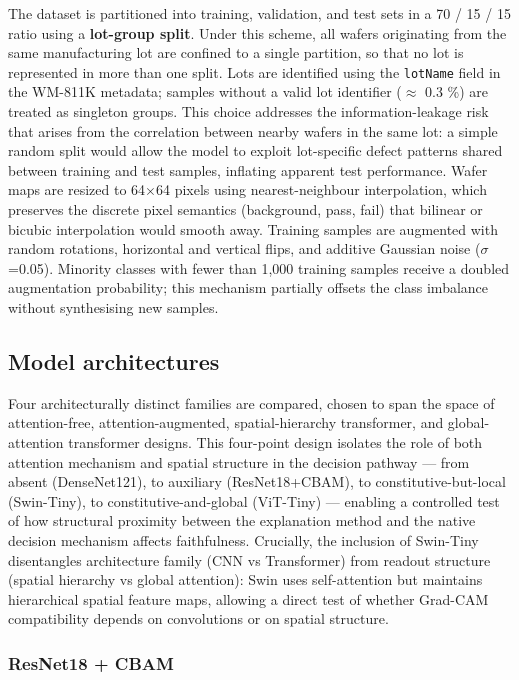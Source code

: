 \documentclass[11pt,a4paper]{article}
\begin{document}
The dataset is partitioned into training, validation, and test sets in a 70 / 15 / 15 ratio using a \textbf{lot-group split}. Under this scheme, all wafers originating from the same manufacturing lot are confined to a single partition, so that no lot is represented in more than one split. Lots are identified using the \texttt{lotName} field in the WM-811K metadata; samples without a valid lot identifier ($\approx$ 0.3 \%) are treated as singleton groups. This choice addresses the information-leakage risk that arises from the correlation between nearby wafers in the same lot: a simple random split would allow the model to exploit lot-specific defect patterns shared between training and test samples, inflating apparent test performance. Wafer maps are resized to 64$\times$64 pixels using nearest-neighbour interpolation, which preserves the discrete pixel semantics (background, pass, fail)
that bilinear or bicubic interpolation would smooth away. Training samples are augmented with random rotations, horizontal and vertical flips, and additive Gaussian noise ($\sigma$=0.05). Minority classes with fewer than 1,000 training samples receive a doubled augmentation probability; this mechanism partially offsets the class imbalance without synthesising new samples.

\subsection{Model architectures}

Four architecturally distinct families are compared, chosen to span the space of attention-free, attention-augmented, spatial-hierarchy transformer, and global-attention transformer designs. This four-point design isolates the role of both attention mechanism and spatial structure in the decision pathway --- from absent (DenseNet121), to auxiliary (ResNet18+CBAM), to constitutive-but-local (Swin-Tiny), to constitutive-and-global (ViT-Tiny) --- enabling a controlled test of how structural proximity between the explanation method and the native decision mechanism affects faithfulness. Crucially, the inclusion of Swin-Tiny disentangles architecture family (CNN vs Transformer) from readout structure (spatial hierarchy vs global attention): Swin uses self-attention but maintains hierarchical spatial feature maps, allowing a direct test of whether Grad-CAM compatibility depends on convolutions
or on spatial structure.

\subsubsection{ResNet18 + CBAM}
\end{document}
